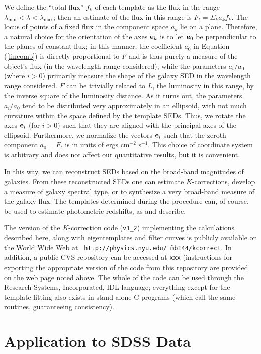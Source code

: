 \documentclass[10pt,preprint]{aastex}
\newcommand{\vv}[1]{{\bf #1}}
\begin{document}
We define the ``total flux'' $f_k$ of each template as the flux in the
range $\lambda_{\mathrm{min}}<\lambda<\lambda_{\mathrm{max}}$; then an
estimate of the flux in this range is $F_{{t}}=\Sigma_k a_k f_k$. The
locus of points of a fixed flux in the component space $a_k$ lie on a
plane. Therefore, a natural choice for the orientation of the axes
$\vv{e}_k$ is to let $\vv{e}_0$ be perpendicular to the planes of
constant flux; in this manner, the coefficient $a_0$ in Equation
(\ref{lincomb}) is directly proportional to $F$ and is thus purely a
measure of the object's flux (in the wavelength range considered),
while the parameters $a_i/a_0$ (where $i>0$) primarily measure the
shape of the galaxy SED in the wavelength range considered. $F$ can be
trivially related to $L$, the luminosity in this range, by the inverse
square of the luminosity distance.  As it turns out, the parameters
$a_i/a_0$ tend to be distributed very approximately in an ellipsoid,
with not much curvature within the space defined by the template
SEDs. Thus, we rotate the axes $\vv{e}_i$ (for $i>0$) such that they
are aligned with the principal axes of the ellipsoid. Furthermore, we
normalize the vectors $\vv{e}_i$ such that the zeroth component
$a_0=F_t$ is in units of ergs cm$^{-2}$ s$^{-1}$. This choice of
coordinate system is arbitrary and does not affect our quantitative
results, but it is convenient.

In this way, we can reconstruct SEDs based on the broad-band
magnitudes of galaxies. From these reconstructed SEDs one can estimate
$K$-corrections, develop a measure of galaxy spectral type, or to
synthesize a very broad-band measure of the galaxy flux.  The
templates determined during the procedure can, of course, be used to
estimate photometric redshifts, as \citet{csabai00a} and
\citet{budavari00a} describe.

The version of the $K$-correction code ({\tt v1\_2}) implementing the
calculations described here, along with eigentemplates and filter
curves is publicly available on the World Wide Web at {\tt
http://physics.nyu.edu/\~\ mb144/kcorrect}. In addition, a public CVS
repository can be accessed at {\tt xxx} (instructions for exporting
the appropriate version of the code from this repository are provided
on the web page noted above. The whole of the code can be used through
the Research Systems, Incorporated, IDL language; everything except
for the template-fitting also exists in stand-alone C programs (which
call the same routines, guaranteeing consistency).

\section{Application to SDSS Data}
\label{data}
\end{document}
